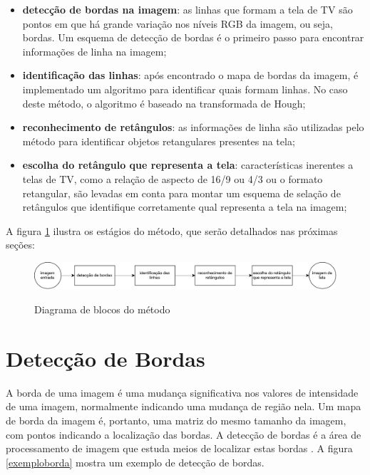 \begin{itemize}
 \item \textbf{detecção de bordas na imagem}: as linhas que formam a tela de TV são pontos em que há grande variação nos níveis RGB da imagem, ou seja, bordas. Um esquema de detecção de bordas é o primeiro passo para encontrar informações de linha na imagem;
 \item \textbf{identificação das linhas}: após encontrado o mapa de bordas da imagem, é implementado um algoritmo para identificar quais formam linhas. No caso deste método, o algoritmo é baseado na transformada de Hough;
 \item \textbf{reconhecimento de retângulos}: as informações de linha são utilizadas pelo método para identificar objetos retangulares presentes na tela;
 \item \textbf{escolha do retângulo que representa a tela}: características inerentes a telas de TV, como a relação de aspecto de 16/9 ou 4/3 ou o formato retangular, são levadas em conta para montar um esquema de selação de retângulos que identifique corretamente qual representa a tela na imagem;
\end{itemize}

A figura \ref{figdiag} ilustra os estágios do método, que serão detalhados nas próximas seções:



\begin{figure} [h]
\includegraphics[width = \textwidth]{figuras/diag.pdf} \label{figdiag}
\caption{Diagrama de blocos do método}
\end{figure}

\section{Detecção de Bordas} \label{met:borda}

A borda de uma imagem é uma mudança significativa nos valores de intensidade de uma imagem, normalmente indicando uma mudança de região nela. Um mapa de borda da imagem é, portanto, uma matriz do mesmo tamanho da imagem, com pontos indicando a localização das bordas. A detecção de bordas é a área de processamento de imagem que estuda meios de localizar estas bordas \cite{borda01}. A figura \ref{exemploborda} mostra um exemplo de detecção de bordas.


